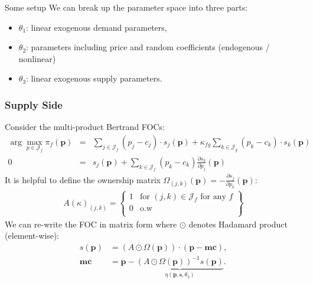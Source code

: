 \documentclass[xcolor=pdftex,dvipsnames,table,mathserif,aspectratio=169]{beamer}
\begin{document}
\begin{frame}{Some setup}
We can break up the parameter space into three parts:
\begin{itemize}
\item $\theta_1$: linear exogenous demand parameters, 
 \item $\theta_2$: parameters including price and random coefficients (endogenous / nonlinear)
 \item $\theta_3$: linear exogenous supply parameters.
\end{itemize}
\end{frame}



\begin{frame}[plain]
\frametitle{Supply Side}
Consider the multi-product Bertrand FOCs:
\footnotesize
{\begin{eqnarray*}
\arg \max_{p \in \mathcal{J}_f} \pi_f (\mathbf{p}) &=& \sum_{j \in \mathcal{J}_f} (p_j - c_j) \cdot s_j(\mathbf{p}) +  \kappa_{fg}\sum_{k \in \mathcal{J}_g} (p_k - c_k) \cdot s_k(\mathbf{p}) \\
0&=& s_j(\mathbf{p}) + \sum_{k \in \mathcal{J}_f} (p_k - c_k) \frac{\partial s_{k}}{\partial p_j}(\mathbf{p}) 
\end{eqnarray*}
}
It is helpful to define the \alert{ownership matrix} $\Omega_{(j,k)}(\mathbf{p})  = - \frac{\partial s_{j}}{\partial p_k}(\mathbf{p})$:
\begin{eqnarray*}
A(\kappa)_{(j,k)} = \left\{\begin{array}{lr}
          1 & \text{for }  (j,k) \in \mathcal{J}_f \text{ for any } f \\ 
	  0 & \text{o.w}\\
        \end{array} \right\}
\end{eqnarray*}
We can re-write the FOC in matrix form where $\odot$ denotes Hadamard product (element-wise):
\begin{eqnarray*}
        s(\mathbf{p}) &= (A \odot \Omega(\mathbf{p})) \cdot (\mathbf{p} - \mathbf{mc}), \\
       \mathbf{mc} &=  \mathbf{p} - \underbrace{(A \odot \Omega(\mathbf{p}))^{-1} s(\mathbf{p})}_{\eta(\mathbf{p},\mathbf{s},\theta_2)}.
\end{eqnarray*}
\end{frame}
\end{document}
